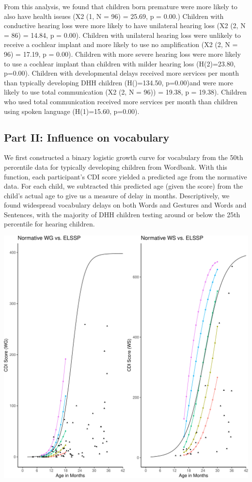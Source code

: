 \documentclass[english,man,floatsintext]{apa6}
\begin{document}
From this analysis, we found that children born premature were more likely to also have health issues (X2 (1, N = 96) = 25.69, p = 0.00.) Children with conductive hearing loss were more likely to have unilateral hearing loss (X2 (2, N = 86) = 14.84, p = 0.00). Children with unilateral hearing loss were unlikely to receive a cochlear implant and more likely to use no amplification (X2 (2, N = 96) = 17.19, p = 0.00). Children with more severe hearing loss were more likely to use a cochlear implant than children with milder hearing loss (H(2)=23.80, p=0.00). Children with developmental delays received more services per month than typically developing DHH children (H()=134.50, p=0.00)and were more likely to use total communication (X2 (2, N = 96)) = 19.38, p = 19.38). Children who used total communication received more services per month than children using spoken language (H(1)=15.60, p=0.00).

\hypertarget{part-ii-influence-on-vocabulary}{%
\subsection{Part II: Influence on vocabulary}\label{part-ii-influence-on-vocabulary}}

We first constructed a binary logistic growth curve for vocabulary from the 50th percentile data for typically developing children from Wordbank. With this function, each participant's CDI score yielded a predicted age from the normative data. For each child, we subtracted this predicted age (given the score) from the child's actual age to give us a measure of delay in months. Descriptively, we found widespread vocabulary delays on both Words and Gestures and Words and Sentences, with the majority of DHH children testing around or below the 25th percentile for hearing children.

\includegraphics{ELSSP_paper_files/figure-latex/wg_ws_rainbow_plot-1.pdf}
\end{document}
